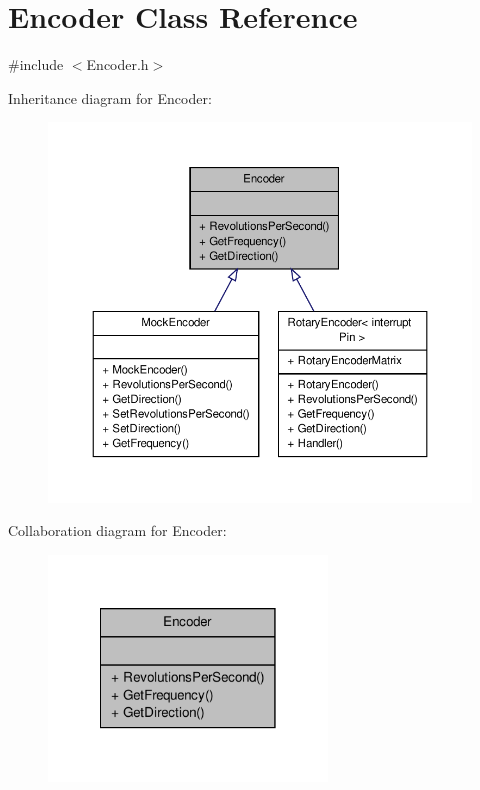 \hypertarget{class_encoder}{\section{Encoder Class Reference}
\label{class_encoder}
}


{\ttfamily \#include $<$Encoder.\-h$>$}



Inheritance diagram for Encoder\-:
\nopagebreak
\begin{figure}[H]
\begin{center}
\leavevmode
\includegraphics[width=350pt]{class_encoder__inherit__graph}
\end{center}
\end{figure}


Collaboration diagram for Encoder\-:
\nopagebreak
\begin{figure}[H]
\begin{center}
\leavevmode
\includegraphics[width=210pt]{class_encoder__coll__graph}
\end{center}
\end{figure}
